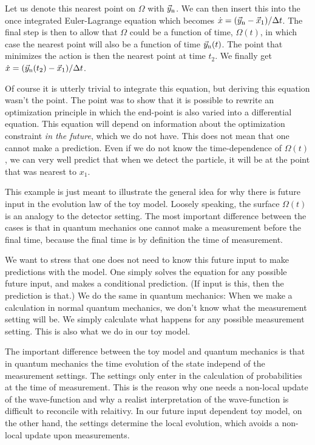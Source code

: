 \documentclass[11pt,twoside,A4]{article}
\begin{document}
Let us denote this nearest point on $\Omega$ with $\vec{y}_{\rm n}$. We can then insert this into the once integrated Euler-Lagrange equation which becomes $\dot{x} = (\vec{y}_{\rm n} -\vec{x}_1 )/\Delta t$. The final step is then to allow that $\Omega$ could be a function of time, $\Omega(t)$, in which case the nearest point will also be a function of time $\vec{y}_{\rm n}(t)$. The point that minimizes the action is then the nearest point at time $t_2$. We finally get $\dot{x} = (\vec{y}_{\rm n}(t_2) -\vec{x}_1 )/\Delta t$. 

Of course it is utterly trivial to integrate this equation, but deriving this equation wasn't the point. The point was to show that it is possible to rewrite an optimization principle in which the end-point is also varied into a differential equation. This equation will depend on information about the optimization constraint {\sl in the future}, which we do not have. This does not mean that one cannot make a prediction. Even if we do not know the time-dependence of 
$\Omega(t)$, we can very well predict that when we detect the particle, it will be at the point that was nearest to $x_1$. 

This example is just meant to illustrate the general idea for why there is future input in the evolution law of the toy model. Loosely speaking, the surface $\Omega(t)$ is an analogy to the detector setting. The most important difference between the cases is that in quantum mechanics one cannot make a measurement before the final time, because the final time is by definition the time of measurement. 

We want to stress that one does not need to know this future input to make predictions with the model. One simply solves the equation for any possible future input, and makes a conditional prediction. (If input is this, then the prediction is that.) We do the same in quantum mechanics: When we make a calculation in normal quantum mechanics, we don't know what the measurement setting will be. We simply calculate what happens for any possible measurement setting. This is also what we do in our toy model. 

The important difference between the toy model and quantum mechanics is that in quantum mechanics the time evolution of the state independ of the measurement settings. The settings only enter in the calculation of probabilities at the time of measurement. This is the reason why one needs a non-local update of the wave-function and why a realist interpretation of the wave-function is difficult to reconcile with relaitivy. In our future input dependent toy model, on the other hand, the settings determine the local evolution, which avoids a non-local update upon measurements. 
\end{document}
